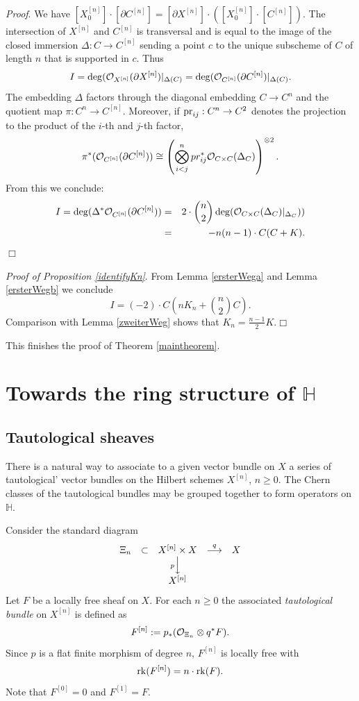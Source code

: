 \documentclass[twoside,11pt]{article}
\newcommand{\prf}{{\kursiv Proof}. }
\newcommand{\qed}{\hspace*{\fill}$\Box$\vspace{2ex}}
\newcommand{\kursiv}{\sl}
\newcommand{\ko}{{\cal O}}
\newcommand{\IH}{{\mathbb H}}
\newcommand{\isom}{\cong}
\newcommand{\tensor}{\otimes}
\newcommand{\rk}{{\rm rk}}
\newcommand{\pr}{{\rm pr}}
\newcommand{\lra}{\longrightarrow}
\begin{document}
\prf We have $[X^{[n]}_0]\cdot[\partial C^{[n]}]=[\partial X^{[n]}]\cdot(
[X^{[n]}_0]\cdot[C^{[n]}])$.
The intersection of $X^{[n]}$ and $C^{[n]}$ is transversal and is equal to 
the image of the closed immersion $\Delta:C\to C^{[n]}$ sending a point $c$ to 
the unique subscheme of $C$ of length $n$ that is supported in $c$.
Thus
$$I=\deg(\ko_{X^{[n]}}(\partial X^{[n]})|_{\Delta(C)}=\deg(\ko_{C^{[n]}}
(\partial C^{[n]})|_{\Delta(C)}.$$
The embedding $\Delta$ factors through the diagonal embedding
$C\to C^n$ and the quotient map $\pi:C^n\to C^{[n]}$. Moreover, if
$\pr_{ij}:C^n\to C^2$ denotes the projection to the product of the $i$-th and 
$j$-th factor,
$$\pi^*(\ko_{C^{[n]}}(\partial C^{[n]}))\isom
\left(\bigotimes_{i<j}^n pr_{ij}^*\ko_{C\times C}(\Delta_C)\right)^{\otimes2}.$$
From this we conclude:
\begin{eqnarray*}I=\deg(\Delta^*\ko_{C^{[n]}}(\partial C^{[n]}))&
=&2\cdot\binom{n}{2}\deg(\ko_{C\times C}(\Delta_C)|_{\Delta_C}))\\
&=&-n(n-1)\cdot C(C+K).
\end{eqnarray*}
\qed


{\kursiv Proof of Proposition \ref{identifyKn}}. From Lemma \ref{ersterWega}
and Lemma \ref{ersterWegb} we conclude
$$I=(-2)\cdot C(nK_n+\binom{n}{2}C ).$$
Comparison with Lemma \ref{zweiterWeg} shows that $K_n=\frac{n-1}{2}K$.\qed

This finishes the proof of Theorem \ref{maintheorem}.

\section{Towards the ring structure of $\IH$}\label{RingStructure}


\subsection{Tautological sheaves}
 
  
There is a natural way to associate to a given vector bundle on $X$ a
series of tautological' vector bundles on the Hilbert schemes $X^{[n]}$, 
$n\geq0$. The Chern classes of the tautological bundles may 
be grouped together to form operators on $\IH$. 

 
Consider the standard diagram
$$\begin{array}{ccccc}
\Xi_n&\subset&X^{[n]}\times X&\stackrel{q}{\lra}&X\\
&&{\scriptstyle p}\Big\downarrow\phantom{\scriptstyle p}\\[1ex]
&&X^{[n]}
\end{array}
$$
Let $F$ be a locally free sheaf on $X$. For each $n\geq 0$ the associated
{\em tautological bundle} on $X^{[n]}$ is defined as
$$F^{[n]}:=p_*(\ko_{\Xi_n}\tensor q^*F).$$
Since $p$ is a flat finite morphism of degree $n$,
$F^{[n]}$ is locally free with
$$\rk(F^{[n]})=n\cdot \rk(F).$$
Note that $F^{[0]}=0$ and $F^{[1]}=F$.
\end{document}
